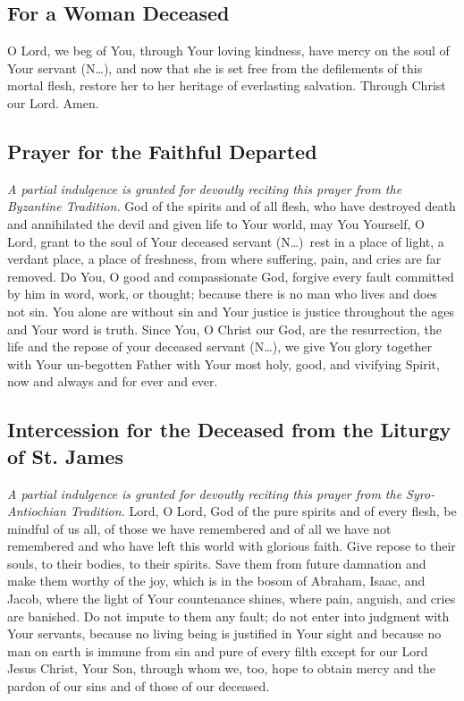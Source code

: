 \documentclass[12pt]{article}
\newcommand{\prayertitle}[1]{\subsection{#1}}
\newcommand{\indulgencedprayertitle}[1]{\prayertitle{#1 \protect\kreuz}}
\newcommand{\insertname}{(N\dots)}
\newcommand{\note}[1]{{\small{\textsl{#1}}}\newline}
\begin{document}
\prayertitle{For a Woman Deceased}
O Lord, we beg of You, through Your loving kindness, have mercy on the soul of Your servant \insertname, and now that she is set free from the defilements of this mortal flesh, restore her to her heritage of everlasting salvation.
Through Christ our Lord. Amen.

\indulgencedprayertitle{Prayer for the Faithful Departed}
\note{A partial indulgence is granted for devoutly reciting this prayer from the Byzantine Tradition.}
God of the spirits and of all flesh, who have destroyed death and annihilated the devil
and given life to Your world, may You Yourself, O Lord, grant to the soul of Your
deceased servant \insertname\ rest in a place of light, a verdant place, a place of freshness, from where suffering, pain, and cries are far removed.
Do You, O good and compassionate God, forgive every fault committed by him in word, work, or thought;
because there is no man who lives and does not sin.
You alone are without sin and Your justice is justice throughout the ages and Your word is truth.
Since You, O Christ our God, are the resurrection, the life and the repose of your
deceased servant \insertname, we give You glory together with Your un-begotten Father with
Your most holy, good, and vivifying Spirit, now and always and for ever and ever.
\newpage
\indulgencedprayertitle{Intercession for the Deceased from the Liturgy of St. James}
\note{A partial indulgence is granted for devoutly reciting this prayer from the Syro-Antiochian Tradition.}
Lord, O Lord, God of the pure spirits and of every flesh, be mindful of us all, of those we have remembered and of all we have not remembered and who have left this world with glorious faith.
Give repose to their souls, to their bodies, to their spirits.
Save them from future damnation and make them worthy of the joy, which is in the bosom of Abraham, Isaac, and Jacob, where the light of Your countenance shines, where pain, anguish, and cries are banished.
Do not impute to them any fault;
do not enter into judgment with Your servants, because no living being is justified in Your sight and because no man on earth is immune from sin and pure of every filth except for our Lord Jesus Christ, Your Son, through whom we, too, hope to obtain mercy and the pardon of our sins and of those of our deceased.
\end{document}
